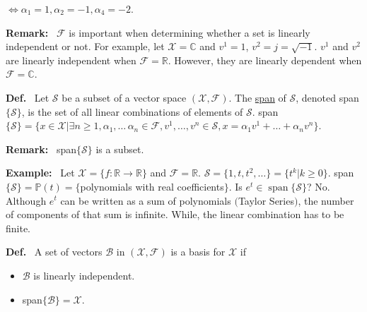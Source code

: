 \documentclass[letterpaper]{article}
\begin{document}
    \newline
    $\iff\alpha_1=1, \alpha_2=-1, \alpha_4=-2$.

\noindent \textbf{Remark:}~ $\mathcal{F}$ is important when determining whether a set is linearly independent or not. For example, let $\mathcal{X}=\mathbb{C}$ and $v^1=1$, $v^2=j=\sqrt{-1}$. $v^1$ and $v^2$ are linearly independent when $\mathcal{F}=\mathbb{R}$. However, they are linearly dependent when $\mathcal{F}=\mathbb{C}$.

\noindent \textbf{Def.}~ Let $\mathcal{S}$ be a subset of a vector space $(\mathcal{X},\mathcal{F})$. The \underline{span} of $\mathcal{S}$, denoted span$\{\mathcal{S}\}$, is the set of all linear combinations of elements of $\mathcal{S}$.
    \newline
    span$\{\mathcal{S}\}=\{x\in\mathcal{X} | \exists n\geq 1, \alpha_1,\dots\,\alpha_n\in\mathcal{F}, v^1,\dots,v^n\in\mathcal{S}, x=\alpha_1v^1+\dots+\alpha_nv^n\}$.

\noindent \textbf{Remark:}~ span$\{\mathcal{S}\}$ is a subset.

\noindent \textbf{Example:}~ Let $\mathcal{X}=\{f: \mathbb{R}\rightarrow\mathbb{R}\}$ and $\mathcal{F}=\mathbb{R}$. $\mathcal{S}=\{1,t,t^2,\dots\}=\{t^k|k\geq0\}$. span$\{\mathcal{S}\}=\mathbb{P}(t)=\{$polynomials with real coefficients$\}$.
    \newline\newline
    Is $e^t\in \operatorname{span}\{\mathcal{S}\}$?
    No. Although $e^t$ can be written as a sum of polynomials $($Taylor Series$)$, the number of components of that sum is infinite. While, the linear combination has to be finite.

\noindent \textbf{Def.}~ A set of vectors $\mathcal{B}$ in $(\mathcal{X},\mathcal{F})$ is a basis for $\mathcal{X}$ if\begin{itemize}
    \item $\mathcal{B}$ is linearly independent.
    \item span$\{\mathcal{B}\}=\mathcal{X}$.
    \end{itemize}

\newpage
\end{document}
